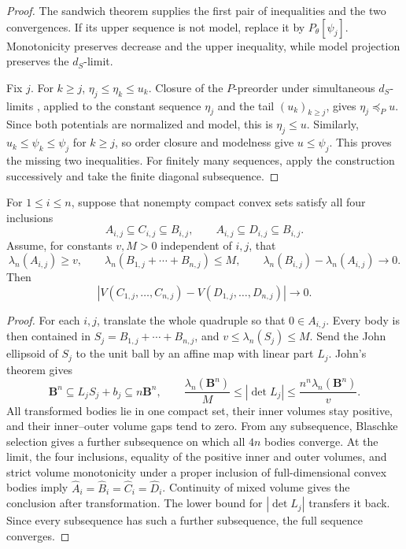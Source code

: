 \begin{proof}
The sandwich theorem \cite[Proposition~6.2.3]{XiaBook} supplies the first
pair of inequalities and the two convergences.  If its upper sequence is
not model, replace it by $P_\theta[\psi_j]$.  Monotonicity preserves
decrease and the upper inequality, while model projection preserves the
$d_S$-limit.

Fix $j$.  For $k\geq j$,
$\eta_j\leq\eta_k\leq u_k$.  Closure of the $P$-preorder under
simultaneous $d_S$-limits \cite[Proposition~6.2.5]{XiaBook}, applied to
the constant sequence $\eta_j$ and the tail $(u_k)_{k\geq j}$, gives
$\eta_j\preceq_Pu$.  Since both potentials are normalized and model,
this is $\eta_j\leq u$.  Similarly,
$u_k\leq\psi_k\leq\psi_j$ for $k\geq j$, so order closure and modelness
give $u\leq\psi_j$.  This proves the missing two inequalities.  For
finitely many sequences, apply the construction successively and take the
finite diagonal subsequence.
\end{proof}

\par\noindent\begin{minipage}{\linewidth}
\begin{lemma}\label{lem:ok-mvob-uniform-sandwich}
For $1\leq i\leq n$, suppose that nonempty compact convex sets satisfy
all four inclusions
\[
 A_{i,j}\subseteq C_{i,j}\subseteq B_{i,j},\qquad
 A_{i,j}\subseteq D_{i,j}\subseteq B_{i,j}.
\tag{55.38}\label{eq:ok-mvob-convex-sandwich}
\]
Assume, for constants $v,M>0$ independent of $i,j$, that
\[
 \lambda_n(A_{i,j})\geq v,\qquad
 \lambda_n(B_{1,j}+\cdots+B_{n,j})\leq M,\qquad
 \lambda_n(B_{i,j})-\lambda_n(A_{i,j})\longrightarrow0.
\]
Then
\[
 \left|V(C_{1,j},\ldots,C_{n,j})
       -V(D_{1,j},\ldots,D_{n,j})\right|\longrightarrow0.
\]
\end{lemma}
\end{minipage}\par


\begin{proof}
For each $i,j$, translate the whole quadruple so that
$0\in A_{i,j}$.  Every body is then contained in
$S_j=B_{1,j}+\cdots+B_{n,j}$, and
$v\leq\lambda_n(S_j)\leq M$.  Send the John ellipsoid of $S_j$ to the
unit ball by an affine map with linear part $L_j$.  John's theorem
\cite[Theorem~10.12.2]{Sch14} gives
\[
 \mathbf B^n\subseteq L_jS_j+b_j\subseteq n\mathbf B^n,\qquad
 \frac{\lambda_n(\mathbf B^n)}{M}\leq|\det L_j|
 \leq\frac{n^n\lambda_n(\mathbf B^n)}{v}.
\]
All transformed bodies lie in one compact set, their inner volumes stay
positive, and their inner--outer volume gaps tend to zero.  From any
subsequence, Blaschke selection \cite[Theorem~1.8.7]{Sch14} gives a further
subsequence on which all
$4n$ bodies converge.  At the limit, the four inclusions, equality of the
positive inner and outer volumes, and strict volume monotonicity under a
proper inclusion of full-dimensional convex bodies imply
$\widehat A_i=\widehat B_i=\widehat C_i=\widehat D_i$.  Continuity of
mixed volume gives the conclusion after transformation.  The lower bound
for $|\det L_j|$ transfers it back.  Since every subsequence has such a
further subsequence, the full sequence converges.
\end{proof}


